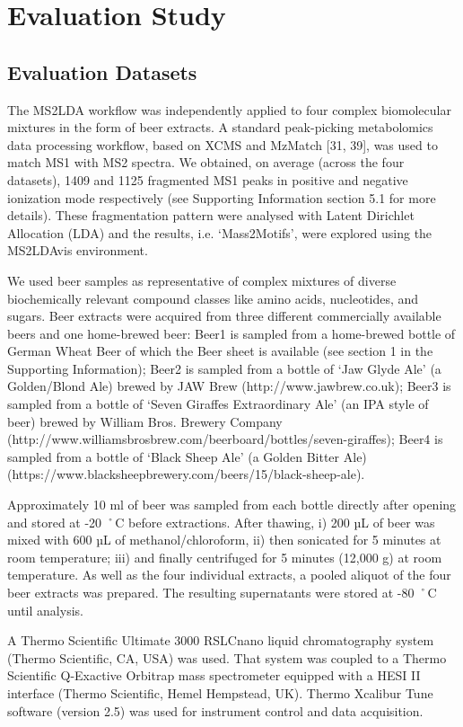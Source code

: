 \section{Evaluation Study}

\subsection{Evaluation Datasets}

The MS2LDA workflow was independently applied to four complex biomolecular mixtures in the form of beer extracts. A standard peak-picking metabolomics data processing workflow, based on XCMS and MzMatch [31, 39], was used to match MS1 with MS2 spectra. We obtained, on average (across the four datasets), 1409 and 1125 fragmented MS1 peaks in positive and negative ionization mode respectively (see Supporting Information section 5.1 for more details). These fragmentation pattern were analysed with Latent Dirichlet Allocation (LDA) and the results, i.e. ‘Mass2Motifs’, were explored using the MS2LDAvis environment.

We used beer samples as representative of complex mixtures of diverse biochemically relevant compound classes like amino acids, nucleotides, and sugars. Beer extracts were acquired from three different commercially available beers and one home-brewed beer: Beer1 is sampled from a home-brewed bottle of German Wheat Beer of which the Beer sheet is available (see section 1 in the Supporting Information); Beer2 is sampled from a bottle of ‘Jaw Glyde Ale’ (a Golden/Blond Ale) brewed by JAW Brew (http://www.jawbrew.co.uk); Beer3 is sampled from a bottle of ‘Seven Giraffes Extraordinary Ale’ (an IPA style of beer) brewed by William Bros. Brewery Company (http://www.williamsbrosbrew.com/beerboard/bottles/seven-giraffes); Beer4 is sampled from a bottle of ‘Black Sheep Ale’ (a Golden Bitter Ale)  (https://www.blacksheepbrewery.com/beers/15/black-sheep-ale).

Approximately 10 ml of beer was sampled from each bottle directly after opening and stored at -20 ˚C before extractions. After thawing, i) 200 µL of beer was mixed with 600 µL of methanol/chloroform, ii) then sonicated for 5 minutes at room temperature; iii) and finally centrifuged for 5 minutes (12,000 g) at room temperature. As well as the four individual extracts, a pooled aliquot of the four beer extracts was prepared. The resulting supernatants were stored at -80 ˚C until analysis.

A Thermo Scientific Ultimate 3000 RSLCnano liquid chromatography system (Thermo Scientific, CA, USA) was used. That system was coupled to a Thermo Scientific Q-Exactive Orbitrap mass spectrometer equipped with a HESI II interface (Thermo Scientific, Hemel Hempstead, UK). Thermo Xcalibur Tune software (version 2.5) was used for instrument control and data acquisition.

